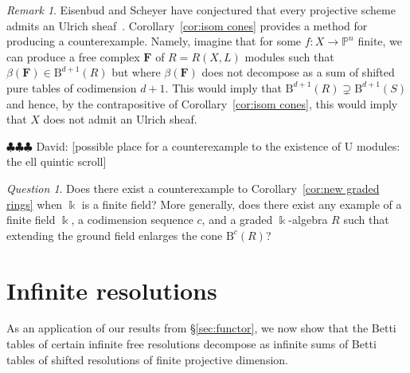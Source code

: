 \documentclass[12pt]{amsart}
\theoremstyle{definition}
\theoremstyle{remark}
\newtheorem{remark}[lemma]{Remark}
\newtheorem{question}[lemma]{Question}
\newcommand{\kk}{\Bbbk}
\newcommand{\PP}{\mathbb{P}}
\newcommand{\cc}{c}
\newcommand{\FF}{\mathbf{F}}
\newcommand{\BBQ}{\mathrm{B}}
\newcommand{\david}[1]{{\color{red} \sf $\clubsuit\clubsuit\clubsuit$ David: [#1]}}
\begin{document}
\begin{remark}
Eisenbud and Scheyer have conjectured that every projective scheme admits an Ulrich sheaf~\cite[p. 543]{eis-schrey-chow}.  Corollary~\ref{cor:isom cones} provides a method for producing a counterexample.  Namely, imagine that for some $f\colon X\to \PP^n$ finite, we can produce a free complex $\FF$ of $R=R(X,L)$ modules such that $\beta(\FF)\in \BBQ^{d+1}(R)$ but where $\beta(\FF)$ does not decompose as a sum of shifted pure tables of codimension $d+1$.  This would imply that $\BBQ^{d+1}(R)\supsetneq \BBQ^{d+1}(S)$ and hence, by the contrapositive of Corollary~\ref{cor:isom cones}, this would imply that $X$ does not admit an Ulrich sheaf.
\end{remark}

\david{possible place for a counterexample to the existence of U modules: the ell quintic scroll}

\begin{question}
Does there exist a counterexample to Corollary~\ref{cor:new graded rings} when $\kk$ is a finite field?  
More generally, does there exist any example of a finite field $\kk$, a codimension sequence $\cc$, and a graded $\kk$-algebra $R$ such that extending the ground field enlarges the cone $\BBQ^{\cc}(R)$?
\end{question}

\section{Infinite resolutions}\label{sec:infinite}
As an application of our results from \S\ref{sec:functor}, we now show that the Betti tables of certain infinite free resolutions decompose as infinite sums of Betti tables of shifted resolutions of finite projective dimension.
%
\end{document}
